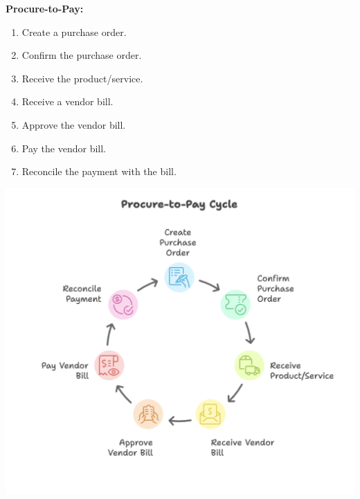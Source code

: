 \documentclass[11pt,a4paper]{article}
\begin{document}
\newpage
\noindent\textbf{Procure-to-Pay:}

\noindent
\begin{minipage}{0.5\textwidth}
\begin{enumerate}
    \item Create a purchase order.
    \item Confirm the purchase order.
    \item Receive the product/service.
    \item Receive a vendor bill.
    \item Approve the vendor bill.
    \item Pay the vendor bill.
    \item Reconcile the payment with the bill.
\end{enumerate}
\end{minipage}%
\hfill
\begin{minipage}{0.45\textwidth}
    \centering
    \includegraphics[width=\linewidth]{diagram/procure_to_pay_cycle.png}
\end{minipage}
\end{document}
